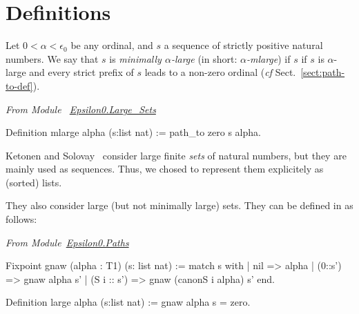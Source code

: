 \section{Definitions}


\begin{definition}
Let $0<\alpha<\epsilon_0$ be any ordinal, and $s$ a sequence of strictly positive natural numbers. 
We say that $s$ is \emph{minimally $\alpha$-large} (in short:
\emph{$\alpha$-mlarge}) if $s$ if $s$ is $\alpha$-large 
 and every strict prefix of $s$ leads to a non-zero ordinal (\emph{cf} Sect.~\vref{sect:path-to-def}).


\end{definition}

\vspace{4pt}

\noindent
\emph{From Module~ \href{../theories/html/hydras.Epsilon0.Large_Sets.html\#mlarge}{Epsilon0.Large\_Sets}}


\begin{Coqsrc}
Definition mlarge alpha (s:list nat) := path_to zero s alpha.
\end{Coqsrc}



\begin{remark}
  Ketonen and Solovay~\cite{KS81} consider  large finite \emph{sets} of natural numbers,  but they are mainly used as sequences. Thus, we chosed to represent them explicitely as (sorted) lists. 

They also consider large (but not minimally large) sets. They can be defined in
\coq{} as follows:


\noindent
\emph{From Module~\href{../theories/html/hydras.Epsilon0.Paths.html\#gnaw}{Epsilon0.Paths}}

\begin{Coqsrc}
Fixpoint gnaw (alpha : T1) (s: list nat) :=
  match s with
    | nil => alpha
    | (0::s') => gnaw  alpha s'
    | (S i :: s')  =>  gnaw (canonS i alpha) s'
  end.

Definition large alpha (s:list nat) := gnaw alpha s = zero.
\end{Coqsrc}
\end{remark}




